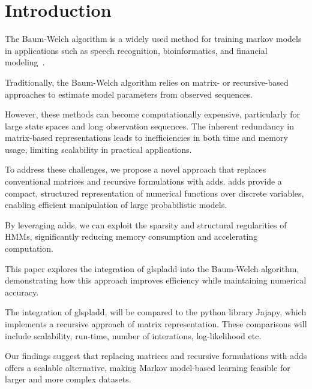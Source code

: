 
\section{Introduction}\label{sec:introduction}
The Baum-Welch algorithm is a widely used method for training markov models in applications such as speech recognition, bioinformatics, and financial modeling~\cite{chavan2013overview,ciocchetta2009bio,mamon2007hidden}.

Traditionally, the Baum-Welch algorithm relies on matrix- or recursive-based approaches to estimate model parameters from observed sequences.

However, these methods can become computationally expensive, particularly for large state spaces and long observation sequences.
The inherent redundancy in matrix-based representations leads to inefficiencies in both time and memory usage, limiting scalability in practical applications.

To address these challenges, we propose a novel approach that replaces conventional matrices and recursive formulations with \glspl{add}.
\glspl{add} provide a compact, structured representation of numerical functions over discrete variables, enabling efficient manipulation of large probabilistic models.

By leveraging \glspl{add}, we can exploit the sparsity and structural regularities of HMMs, significantly reducing memory consumption and accelerating computation.

This paper explores the integration of glspl{add} into the Baum-Welch algorithm, demonstrating how this approach improves efficiency while maintaining numerical accuracy.

The integration of glspl{add}, will be compared to the python library Jajapy, which implements a recursive approach of matrix representation.
These comparisons will include scalability, run-time, number of interations, log-likelihood etc.

Our findings suggest that replacing matrices and recursive formulations with \glspl{add} offers a scalable alternative, making Markov model-based learning feasible for larger and more complex datasets.